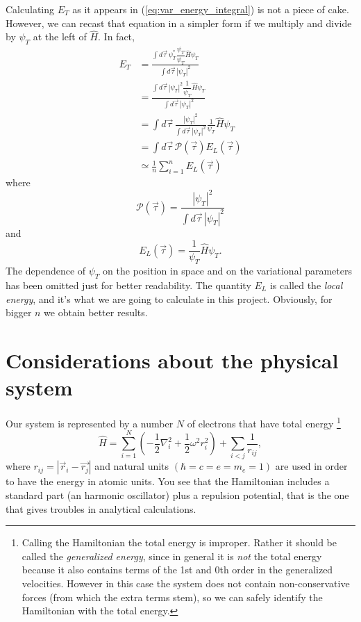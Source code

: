 \documentclass[a4paper,twoside,11pt]{book}
\begin{document}
Calculating $E_T$ as it appears in (\ref{eq:var_energy_integral}) is not a piece of cake. However, we can recast that equation in a simpler form if we multiply and divide by $\psi_T$ at the left of $\hat{H}$. In fact,
\begin{align}
	E_T 
	&= \frac{\int d\vec{\tau} \, \psi_T^* \dfrac{\psi_T}{\psi_T} \hat{H} \psi_T}{\int d\vec{\tau} \, |\psi_T|^2} \\
	&= \frac{\int d\vec{\tau} \, |\psi_T|^2 \dfrac{1}{\psi_T} \hat{H} \psi_T}{\int d\vec{\tau} \, |\psi_T|^2} \\
	&= \int d\vec{\tau} \, \frac{|\psi_T|^2}{\int d\vec{\tau} \, |\psi_T|^2} \frac{1}{\psi_T} \hat{H} \psi_T \\
	&= \int d\vec{\tau} \, \mathcal{P}(\vec{\tau}) E_L(\vec{\tau}) \\
	&\simeq \frac{1}{n} \sum_{i = 1}^{n} E_L(\vec{\tau})
\end{align}
where
\begin{equation}
	\mathcal{P}(\vec{\tau}) = \frac{|\psi_T|^2}{\int d\vec{\tau} \, |\psi_T|^2}
\end{equation}
and
\begin{equation}
	E_L(\vec{\tau}) = \frac{1}{\psi_T} \hat{H} \psi_T.
\end{equation}
The dependence of $\psi_T$ on the position in space and on the variational parameters has been omitted just for better readability. The quantity $E_L$ is called the \emph{local energy}, and it's what we are going to calculate in this project. Obviously, for bigger $n$ we obtain better results.

\section{Considerations about the physical system}
\label{sec:considerations}
Our system is represented by a number $N$ of electrons that have total energy
\footnote{
Calling the Hamiltonian the total energy is improper. Rather it should be called the \emph{generalized energy}, since in general it is \emph{not} the total energy because it also contains terms of the 1st and 0th order in the generalized velocities. However in this case the system does not contain non-conservative forces (from which the extra terms stem), so we can safely identify the Hamiltonian with the total energy.
}
\begin{equation}
	\hat{H} = 
	\sum_{i=1}^{N} \left( -\frac{1}{2}\nabla_i^2 + \frac{1}{2}\omega^2r_i^2 \right)
	+ \sum_{i<j}\frac{1}{r_{ij}},
	\label{eq:full_hamiltonian}
\end{equation}
where $r_{ij} = |\vec{r}_i - \vec{r_j}|$ and natural units $( \hbar = c = e = m_e = 1)$ are used in order to have the energy in atomic units. You see that the Hamiltonian includes a standard part (an harmonic oscillator) plus a repulsion potential, that is the one that gives troubles in analytical calculations.
\end{document}

